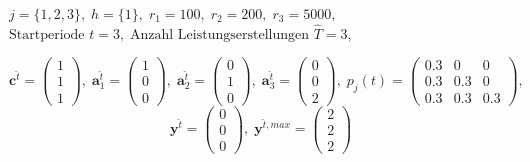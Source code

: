 \begin{center}
$j = \{1, 2, 3\}, \; h = \{1\}, \; r_{1} = 100, \; r_{2} = 200, \; r_{3} = 5000,$ \\
$\text{Startperiode } t=3, \; \text{Anzahl Leistungserstellungen } \hat{T}= 3$,
\end{center}
\[
    \textbf{c}^{\hat{t}}=\begin{pmatrix} 1\\ 1\\ 1  \end{pmatrix}, \;
    \textbf{a}^{\hat t}_{1}=\begin{pmatrix} 1\\ 0\\ 0  \end{pmatrix}, \;
     \textbf{a}^{\hat t}_{2}=\begin{pmatrix} 0\\ 1\\ 0  \end{pmatrix}, \;
       \textbf{a}^{\hat t}_{3}=\begin{pmatrix} 0\\ 0\\ 2  \end{pmatrix}, \;
            p_{j}(t)=
       \begin{pmatrix}
       0.3 & 0 & 0 \\
0.3 & 0.3 & 0 \\
0.3 & 0.3 & 0.3
\end{pmatrix}, 
  \]
  \[
    \textbf{y}^{\hat t}= \begin{pmatrix} 0\\ 0\\ 0  \end{pmatrix}, \;
    \textbf{y}^{\hat t, max}=\begin{pmatrix} 2\\ 2\\ 2  \end{pmatrix}
      \]
      
